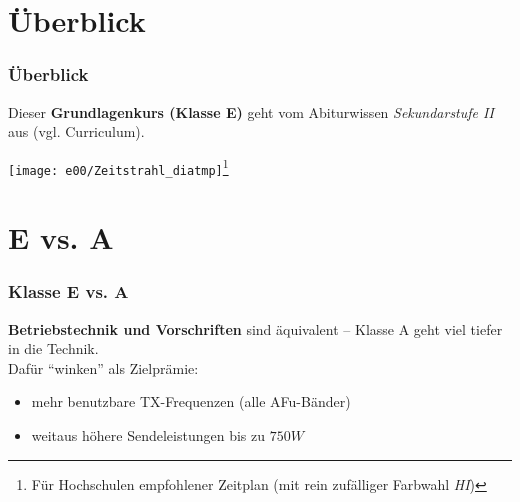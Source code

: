 \begin{frame}
\begin{columns}[c]
\begin{center}
            \tiny \hyperlink{refs}{\cite{meph}}
        \end{center}
        \column{6.5cm}
    \end{columns}

\end{frame}

\section{Überblick}

\begin{frame}
    \frametitle{Überblick}

    Dieser \textbf{Grundlagenkurs (Klasse E)} geht vom Abiturwissen
    \emph{Sekundarstufe II} aus (vgl. Curriculum\hyperlink{refs}{\cite{curr}}).

    \vspace{2em}

    \texttt{[image: e00/Zeitstrahl\_diatmp]}\footnote{Für
    Hochschulen empfohlener Zeitplan \tiny (mit rein zufälliger Farbwahl \emph{HI})}

\end{frame}

\section{E vs. A}

\begin{frame}
    \frametitle{Klasse E vs. A}

    \textbf{Betriebstechnik und Vorschriften} sind äquivalent -- Klasse A geht
    viel tiefer in die Technik. \\[2em]

    Dafür "`winken"' als Zielprämie:

    \begin{itemize}
        \item mehr benutzbare TX-Frequenzen (alle AFu-Bänder)
        \item weitaus höhere Sendeleistungen bis zu $750W$
    \end{itemize}

\end{frame}

